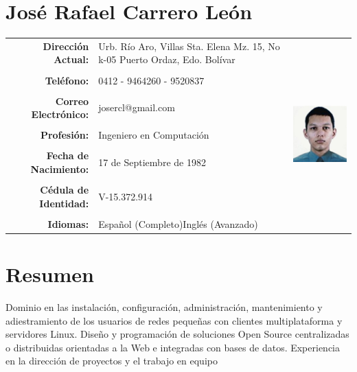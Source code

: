 \documentclass[letterpaper,11pt]{report}
\begin{document}
\section*{José Rafael Carrero León}

\begin{tabular}{r p{2.4in} p{46mm}}
\textbf{Dirección Actual:}&Urb. Río Aro, Villas Sta. Elena\newline
Mz. 15, No k-05 \newline
Puerto Ordaz, Edo. Bolívar & \multirow{13}{*}{\includegraphics[scale=.8]{foto_curriculum}}\\
 & & \\
\textbf{Teléfono:}&0412 - 9464260\newline 0286 - 9520837&\\
 & & \\
\textbf{Correo Electrónico:}&josercl@gmail.com&\\
 & & \\
\textbf{Profesión:}&Ingeniero en Computación&\\
 & & \\
\textbf{Fecha de Nacimiento:}&17 de Septiembre de 1982&\\
 & & \\
\textbf{Cédula de Identidad:}&V-15.372.914&\\
 & & \\
\textbf{Idiomas:}&Espa\~{n}ol (Completo)\newline Inglés (Avanzado)&\\
\end{tabular}


\section*{Resumen}
Dominio en las instalación, configuración, administración, mantenimiento y adiestramiento de los usuarios de redes peque\~{n}as con clientes multiplataforma y servidores Linux. Dise\~{n}o y programación de soluciones Open Source centralizadas o distribuidas orientadas a la Web e integradas con bases de datos. Experiencia en la dirección de proyectos y el trabajo en equipo
\end{document}
